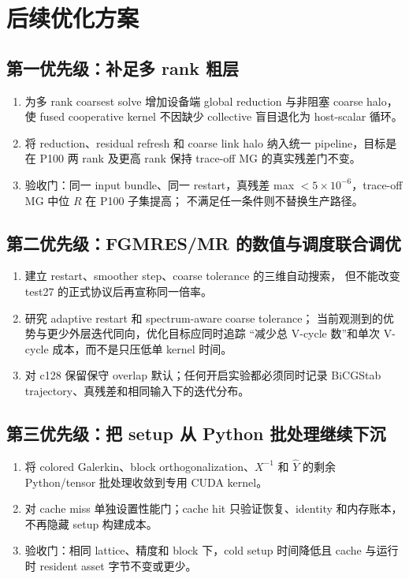 \documentclass[UTF8,a4paper,11pt]{ctexart}
\begin{document}
\section{后续优化方案}

\subsection{第一优先级：补足多 rank 粗层}

\begin{enumerate}[leftmargin=2em]
  \item 为多 rank coarsest solve 增加设备端 global reduction 与非阻塞
        coarse halo，使 fused cooperative kernel 不因缺少 collective
        盲目退化为 host-scalar 循环。
  \item 将 reduction、residual refresh 和 coarse link halo 纳入统一
        pipeline，目标是在 P100 两 rank 及更高 rank 保持 trace-off MG
        的真实残差门不变。
  \item 验收门：同一 input bundle、同一 restart，真残差 max
        $<5\times10^{-6}$，trace-off MG 中位 $R$ 在 P100 子集提高；
        不满足任一条件则不替换生产路径。
\end{enumerate}

\subsection{第二优先级：FGMRES/MR 的数值与调度联合调优}

\begin{enumerate}[leftmargin=2em]
  \item 建立 restart、smoother step、coarse tolerance 的三维自动搜索，
        但不能改变 test27 的正式协议后再宣称同一倍率。
  \item 研究 adaptive restart 和 spectrum-aware coarse tolerance；
        当前观测到的优势与更少外层迭代同向，优化目标应同时追踪
        “减少总 V-cycle 数”和单次 V-cycle 成本，而不是只压低单 kernel 时间。
  \item 对 c128 保留保守 overlap 默认；任何开启实验都必须同时记录
        BiCGStab trajectory、真残差和相同输入下的迭代分布。
\end{enumerate}

\subsection{第三优先级：把 setup 从 Python 批处理继续下沉}

\begin{enumerate}[leftmargin=2em]
  \item 将 colored Galerkin、block orthogonalization、$X^{-1}$ 和
        $\widehat Y$ 的剩余 Python/tensor 批处理收敛到专用 CUDA kernel。
  \item 对 cache miss 单独设置性能门；cache hit 只验证恢复、identity
        和内存账本，不再隐藏 setup 构建成本。
  \item 验收门：相同 lattice、精度和 block 下，cold setup 时间降低且
        cache 与运行时 resident asset 字节不变或更少。
\end{enumerate}
\end{document}
